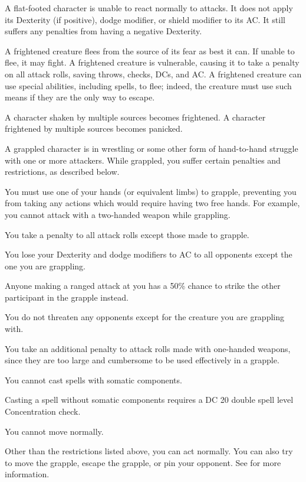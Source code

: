  A flat-footed character is unable to react normally to attacks. It does not apply its Dexterity (if positive), dodge modifier, or shield modifier to its AC. It still suffers any penalties from having a negative Dexterity.

 A frightened creature flees from the source of its fear as best it can. If unable to flee, it may fight. A frightened creature is vulnerable, causing it to take a  penalty on all attack rolls, saving throws, checks, DCs, and AC. A frightened creature can use special abilities, including spells, to flee; indeed, the creature must use such means if they are the only way to escape.

A character shaken by multiple sources becomes frightened. A character frightened by multiple sources becomes panicked.

 A grappled character is in wrestling or some other form of hand-to-hand struggle with one or more attackers. While grappled, you suffer certain penalties and restrictions, as described below.
\begin{itemize*}
\item You must use one of your hands (or equivalent limbs) to grapple, preventing you from taking any actions which would require having two free hands. For example, you cannot attack with a two-handed weapon while grappling.
\item You take a  penalty to all attack rolls except those made to grapple.
\item You lose your Dexterity and dodge modifiers to AC to all opponents except the one you are grappling.
\item Anyone making a ranged attack at you has a 50\% chance to strike the other participant in the grapple instead.
\item You do not threaten any opponents except for the creature you are grappling with.
\item You take an additional  penalty to attack rolls made with one-handed weapons, since they are too large and cumbersome to be used effectively in a grapple.
\item You cannot cast spells with somatic components.
\item Casting a spell without somatic components requires a DC 20 \add double spell level Concentration check.
\item You cannot move normally.
\end{itemize*}
Other than the restrictions listed above, you can act normally. You can also try to move the grapple, escape the grapple, or pin your opponent. See  for more information.

